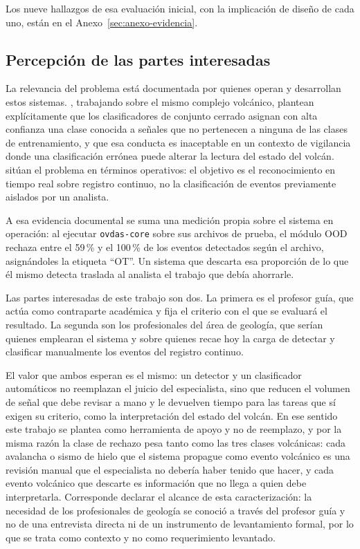 Los nueve hallazgos de esa evaluación inicial, con la implicación de diseño de
cada uno, están en el Anexo~\ref{sec:anexo-evidencia}.

\subsection{Percepción de las partes interesadas}
\label{subsec:interesados}

La relevancia del problema está documentada por quienes operan y desarrollan
estos sistemas. \textcite{espinosacurilem2025ood}, trabajando sobre el mismo
complejo volcánico, plantean explícitamente que los clasificadores de conjunto
cerrado asignan con alta confianza una clase conocida a señales que no
pertenecen a ninguna de las clases de entrenamiento, y que esa conducta es
inaceptable en un contexto de vigilancia donde una clasificación errónea puede
alterar la lectura del estado del volcán.
\textcite{espinosacurilem2026segmentacion} sitúan el problema en términos
operativos: el objetivo es el reconocimiento en tiempo real sobre registro
continuo, no la clasificación de eventos previamente aislados por un analista.

A esa evidencia documental se suma una medición propia sobre el sistema en
operación: al ejecutar \texttt{ovdas-core} sobre sus archivos de prueba, el
módulo OOD rechaza entre el 59\,\% y el 100\,\% de los eventos detectados según
el archivo, asignándoles la etiqueta \enquote{OT}. Un sistema que descarta esa
proporción de lo que él mismo detecta traslada al analista el trabajo que
debía ahorrarle.

Las partes interesadas de este trabajo son dos. La primera es el profesor guía,
que actúa como contraparte académica y fija el criterio con el que se evaluará
el resultado. La segunda son los profesionales del área de geología, que serían
quienes emplearan el sistema y sobre quienes recae hoy la carga de detectar y
clasificar manualmente los eventos del registro continuo.

El valor que ambos esperan es el mismo: un detector y un clasificador
automáticos no reemplazan el juicio del especialista, sino que reducen el
volumen de señal que debe revisar a mano y le devuelven tiempo para las tareas
que sí exigen su criterio, como la interpretación del estado del volcán. En ese
sentido este trabajo se plantea como herramienta de apoyo y no de reemplazo, y
por la misma razón la clase de rechazo pesa tanto como las tres clases
volcánicas: cada avalancha o sismo de hielo que el sistema propague como
evento volcánico es una revisión manual que el especialista no debería haber
tenido que hacer, y cada evento volcánico que descarte es información que no
llega a quien debe interpretarla. Corresponde declarar el alcance de esta
caracterización: la necesidad de los profesionales de geología se conoció a
través del profesor guía y no de una entrevista directa ni de un instrumento de
levantamiento formal, por lo que se trata como contexto y no como requerimiento
levantado.


